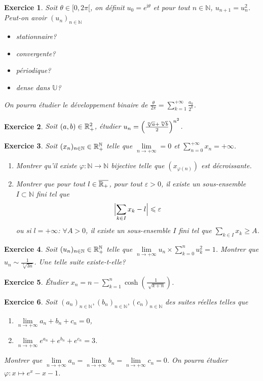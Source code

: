 \documentclass[12pt]{article}
\newtheorem{exercise}{Exercice}[section]
\theoremstyle{remark}
\theoremstyle{remark}
\newcommand{\N}{\mathbb{N}} \newcommand{\Z}{\mathbb{Z}}
\newcommand{\U}{\mathbb{U}} \newcommand{\E}{\mathbb{E}}
\begin{document}
\begin{exercise}
	Soit $\theta\in[0,2\pi[$, on définit $u_{0}=e^{\mathrm{i}\theta}$ et pour tout
	$n\in\N$, $u_{n+1}=u_{n}^{2}$. Peut-on avoir $(u_{n})_{n\in\N}$
	\begin{itemize}
		\item
		stationnaire?
		\item
		convergente?
		\item
		périodique?
		\item
		dense dans $\U$?
	\end{itemize}
	On pourra étudier le développement binaire de
	$\frac{\theta}{2\pi}=\sum_{k=1}^{+\infty}\frac{a_{k}}{2^{k}}$.
\end{exercise}

\begin{exercise}
	Soit $(a,b)\in\mathbb{R}_{+}^{2}$, étudier
	$u_{n}=\Bigl(\frac{\sqrt[n]{a}+\sqrt[n]{b}}{2}\Bigr)^{n^{2}}$.
\end{exercise}

\begin{exercise}
	Soit $(x_{n})_{n\in\N}\in\R_{+}^{\N}$ telle que $\lim\limits_{n\to+\infty}=0$
	et $\sum_{n=0}^{+\infty}x_{n}=+\infty$.
	\begin{enumerate}
		\item
		Montrer qu'il existe $\varphi:\N\to\N$ bijective telle que
		$(x_{\varphi(n)})$ est décroissante.
		\item
		Montrer que pour tout $l\in\overline{\mathbb{R}_{+}}$, pour tout $\varepsilon>0$,
		il existe un sous-ensemble $I\subset\N$ fini tel que
		$$\Bigl\vert\sum_{k\in I}x_{k}-l\Bigr\vert\leqslant\varepsilon$$ ou si
		$l=+\infty$: $\forall A>0$, il existe un sous-ensemble $I$ fini tel que
		$\sum_{k\in I}x_{k}\geqslant A$.
	\end{enumerate}
\end{exercise}

\begin{exercise}
	Soit $(u_{n})_{n\in\N}\in\R_{+}^{\N}$ telle que
	$\lim\limits_{n\to+\infty}u_{n}\times\sum_{k=0}^{n}u_{k}^{2}=1$. Montrer que
	$u_{n}\sim\frac{1}{\sqrt[3]{3n}}$. Une telle suite existe-t-elle?
\end{exercise}

\begin{exercise}
	Étudier $x_{n}=n-\sum_{k=1}^{n}\cosh(\frac{1}{\sqrt[]{k+n}})$.
\end{exercise}

\begin{exercise}
	Soit $(a_{n})_{n\in\N},(b_{n})_{n\in\N},(c_{n})_{n\in\N}$ des suites réelles
	telles que 
	\begin{enumerate}
		\item
		[(i)] $\lim\limits_{n\to+\infty}a_{n}+b_{n}+c_{n}=0$,
		\item [(ii)]
		$\lim\limits_{n\to+\infty}e^{a_{n}}+e^{b_{n}}+e^{c_{n}}=3$.
	\end{enumerate}
	Montrer que
	$\lim\limits_{n\to+\infty}a_{n}=\lim\limits_{n\to+\infty}b_{n}=\lim\limits_{n\to+\infty}c_{n}=0$.
	On pourra étudier $\varphi:x\mapsto e^{x}-x-1$.
\end{exercise}
\end{document}
